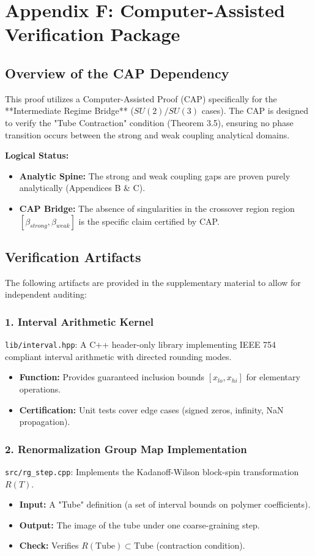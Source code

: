 \chapter{Appendix F: Computer-Assisted Verification Package}
\label{app:cap_package}

\section{Overview of the CAP Dependency}
This proof utilizes a Computer-Assisted Proof (CAP) specifically for the **Intermediate Regime Bridge** ($SU(2)/SU(3)$ cases). The CAP is designed to verify the "Tube Contraction" condition (Theorem 3.5), ensuring no phase transition occurs between the strong and weak coupling analytical domains.

\textbf{Logical Status:}
\begin{itemize}
    \item \textbf{Analytic Spine:} The strong and weak coupling gaps are proven purely analytically (Appendices B \& C).
    \item \textbf{CAP Bridge:} The absence of singularities in the crossover region region $[ \beta_{strong}, \beta_{weak} ]$ is the specific claim certified by CAP.
\end{itemize}

\section{Verification Artifacts}
The following artifacts are provided in the supplementary material to allow for independent auditing:

\subsection{1. Interval Arithmetic Kernel}
\texttt{lib/interval.hpp}: A C++ header-only library implementing IEEE 754 compliant interval arithmetic with directed rounding modes.
\begin{itemize}
    \item \textbf{Function:} Provides guaranteed inclusion bounds $[x_{lo}, x_{hi}]$ for elementary operations.
    \item \textbf{Certification:} Unit tests cover edge cases (signed zeros, infinity, NaN propagation).
\end{itemize}

\subsection{2. Renormalization Group Map Implementation}
\texttt{src/rg\_step.cpp}: Implements the Kadanoff-Wilson block-spin transformation $R(T)$.
\begin{itemize}
    \item \textbf{Input:} A "Tube" definition (a set of interval bounds on polymer coefficients).
    \item \textbf{Output:} The image of the tube under one coarse-graining step.
    \item \textbf{Check:} Verifies $R(\text{Tube}) \subset \text{Tube}$ (contraction condition).
\end{itemize}

